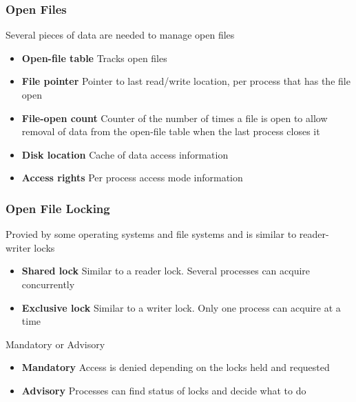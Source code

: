 \documentclass[oneside]{book}
\begin{document}
                \subsubsection{Open Files}
                    Several pieces of data are needed to manage open files
                    \begin{itemize}
                        \item \textbf{Open-file table}
                            \subitem Tracks open files
                        \item \textbf{File pointer}
                            \subitem Pointer to last read/write location, per process that has the file open
                        \item \textbf{File-open count}
                            \subitem Counter of the number of times a file is open to allow removal of data from the open-file table
                            when the last process closes it
                        \item \textbf{Disk location}
                            \subitem Cache of data access information
                        \item \textbf{Access rights}
                            \subitem Per process access mode information
                    \end{itemize}
                \subsubsection{Open File Locking}
                    Provied by some operating systems and file systems and is similar to reader-writer locks
                    \begin{itemize}
                        \item \textbf{Shared lock}
                            \subitem Similar to a reader lock. Several processes can acquire concurrently
                        \item \textbf{Exclusive lock}
                            \subitem Similar to a writer lock. Only one process can acquire at a time
                    \end{itemize}
                    Mandatory or Advisory
                    \begin{itemize}
                        \item \textbf{Mandatory}
                            \subitem Access is denied depending on the locks held and requested
                        \item \textbf{Advisory}
                            \subitem Processes can find status of locks and decide what to do
                    \end{itemize}
\end{document}
